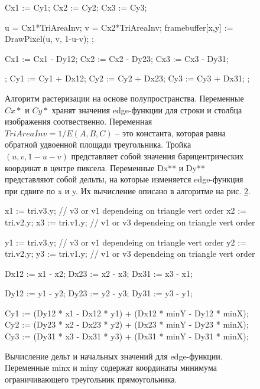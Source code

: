 \documentclass[12pt,subf,href,colorlinks=true]{article}
\begin{document}
\begin{figure}[h]
	\begin{algorithmic}[1]

		\State Cx1 := Cy1;
		\State Cx2 := Cy2;
		\State Cx3 := Cy3;


		\State u = Cx1*TriAreaInv;
		\State v = Cx2*TriAreaInv;
		\State framebuffer[x,y] := DrawPixel(u, v, 1-u-v);
		\EndIf;

		\State Cx1 := Cx1 - Dy12;
		\State Cx2 := Cx2 - Dy23;
		\State Cx3 := Cx3 - Dy31;

		\EndFor;
		\State Cy1 := Cy1 + Dx12;
		\State Cy2 := Cy2 + Dx23;
		\State Cy3 := Cy3 + Dx31;
		\EndFor;

	\end{algorithmic}
	\caption{Алгоритм растеризации на основе полупространства. Переменные $Cx*$ и $Cy*$ хранят значения edge-функции для строки и столбца изображения соотвественно. Переменная  $TriAreaInv=1/E(A,B,C)$ -- это константа, которая равна обратной удвоенной площади треугольника. Тройка $(u,v, 1-u-v)$ представляет собой значения барицентрических координат в центре пиксела.
    Переменные Dx** и Dy** представляют собой дельты, на которые изменяется edge-функция при сдвиге по x и y. Их вычисление описано в алгоритме на рис. \ref{alg:halfspace2}.
 }\label{alg:halfspace}
\end{figure}

\begin{figure}[h]
	\begin{algorithmic}[1]

	 \State x1 := tri.v3.y; // v3 or v1 dependeing on triangle vert order
	 \State x2 := tri.v2.y;
	 \State x3 := tri.v1.y; // v1 or v3 dependeing on triangle vert order

	 \State y1 := tri.v3.y; // v3 or v1 dependeing on triangle vert order
	 \State y2 := tri.v2.y;
	 \State y3 := tri.v1.y; // v1 or v3 dependeing on triangle vert order

     \State Dx12 := x1 - x2;
     \State Dx23 := x2 - x3;
     \State Dx31 := x3 - x1;

     \State Dy12 := y1 - y2;
     \State Dy23 := y2 - y3;
     \State Dy31 := y3 - y1;

     \State Cy1 := (Dy12 * x1 - Dx12 * y1) + (Dx12 * minY - Dy12 * minX);
	 \State Cy2 := (Dy23 * x2 - Dx23 * y2) + (Dx23 * minY - Dy23 * minX);
	 \State Cy3 := (Dy31 * x3 - Dx31 * y3) + (Dx31 * minY - Dy31 * minX);

	\end{algorithmic}
	\caption{Вычисление дельт и начальных значений для edge-функции. Переменные minx и miny содержат координаты минимума ограничивающего треугольник прямоугольника. }\label{alg:halfspace2}
\end{figure}
\end{document}
